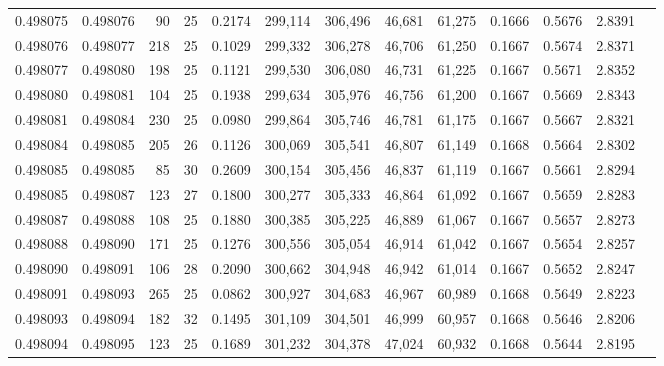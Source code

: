 \begin{tabular}{rrrrrrrrrrrrr}
0.498075 & 0.498076 &  90 &  25 &                                     0.2174 & 299,114 & 306,496 &  46,681 &  61,275 & 0.1666 & 0.5676 & 2.8391 \\
0.498076 & 0.498077 & 218 &  25 &                                     0.1029 & 299,332 & 306,278 &  46,706 &  61,250 & 0.1667 & 0.5674 & 2.8371 \\
0.498077 & 0.498080 & 198 &  25 &                                     0.1121 & 299,530 & 306,080 &  46,731 &  61,225 & 0.1667 & 0.5671 & 2.8352 \\
0.498080 & 0.498081 & 104 &  25 &                                     0.1938 & 299,634 & 305,976 &  46,756 &  61,200 & 0.1667 & 0.5669 & 2.8343 \\
0.498081 & 0.498084 & 230 &  25 &                                     0.0980 & 299,864 & 305,746 &  46,781 &  61,175 & 0.1667 & 0.5667 & 2.8321 \\
0.498084 & 0.498085 & 205 &  26 &                                     0.1126 & 300,069 & 305,541 &  46,807 &  61,149 & 0.1668 & 0.5664 & 2.8302 \\
0.498085 & 0.498085 &  85 &  30 &                                     0.2609 & 300,154 & 305,456 &  46,837 &  61,119 & 0.1667 & 0.5661 & 2.8294 \\
0.498085 & 0.498087 & 123 &  27 &                                     0.1800 & 300,277 & 305,333 &  46,864 &  61,092 & 0.1667 & 0.5659 & 2.8283 \\
0.498087 & 0.498088 & 108 &  25 &                                     0.1880 & 300,385 & 305,225 &  46,889 &  61,067 & 0.1667 & 0.5657 & 2.8273 \\
0.498088 & 0.498090 & 171 &  25 &                                     0.1276 & 300,556 & 305,054 &  46,914 &  61,042 & 0.1667 & 0.5654 & 2.8257 \\
0.498090 & 0.498091 & 106 &  28 &                                     0.2090 & 300,662 & 304,948 &  46,942 &  61,014 & 0.1667 & 0.5652 & 2.8247 \\
0.498091 & 0.498093 & 265 &  25 &                                     0.0862 & 300,927 & 304,683 &  46,967 &  60,989 & 0.1668 & 0.5649 & 2.8223 \\
0.498093 & 0.498094 & 182 &  32 &                                     0.1495 & 301,109 & 304,501 &  46,999 &  60,957 & 0.1668 & 0.5646 & 2.8206 \\
0.498094 & 0.498095 & 123 &  25 &                                     0.1689 & 301,232 & 304,378 &  47,024 &  60,932 & 0.1668 & 0.5644 & 2.8195 \\

\end{tabular}
